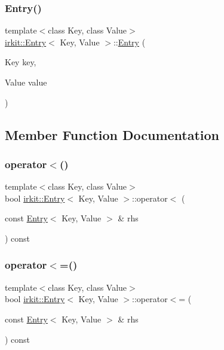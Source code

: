 \subsubsection{\texorpdfstring{Entry()}{Entry()}\hspace{0.1cm}{\footnotesize\ttfamily [2/2]}}
{\footnotesize\ttfamily template$<$class Key, class Value$>$ \\
\mbox{\hyperlink{structirkit_1_1Entry}{irkit\+::\+Entry}}$<$ Key, Value $>$\+::\mbox{\hyperlink{structirkit_1_1Entry}{Entry}} (\begin{DoxyParamCaption}\item[{Key}]{key,  }\item[{Value}]{value }\end{DoxyParamCaption})\hspace{0.3cm}{\ttfamily [inline]}}



\subsection{Member Function Documentation}
\mbox{\label{structirkit_1_1Entry_a4112e1db14a84edfe80b4e75ed8a328c}} 
\subsubsection{\texorpdfstring{operator$<$()}{operator<()}}
{\footnotesize\ttfamily template$<$class Key, class Value$>$ \\
bool \mbox{\hyperlink{structirkit_1_1Entry}{irkit\+::\+Entry}}$<$ Key, Value $>$\+::operator$<$ (\begin{DoxyParamCaption}\item[{const \mbox{\hyperlink{structirkit_1_1Entry}{Entry}}$<$ Key, Value $>$ \&}]{rhs }\end{DoxyParamCaption}) const\hspace{0.3cm}{\ttfamily [inline]}}

\mbox{\label{structirkit_1_1Entry_aa84e1aed3325a2c1bfef85b71a20ed74}} 
\subsubsection{\texorpdfstring{operator$<$=()}{operator<=()}}
{\footnotesize\ttfamily template$<$class Key, class Value$>$ \\
bool \mbox{\hyperlink{structirkit_1_1Entry}{irkit\+::\+Entry}}$<$ Key, Value $>$\+::operator$<$= (\begin{DoxyParamCaption}\item[{const \mbox{\hyperlink{structirkit_1_1Entry}{Entry}}$<$ Key, Value $>$ \&}]{rhs }\end{DoxyParamCaption}) const\hspace{0.3cm}{\ttfamily [inline]}}

